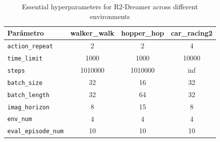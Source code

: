 \documentclass{article}
\begin{document}
\begin{table}[H]
    \centering
    \caption{Essential hyperparameters for R2-Dreamer across different environments}
    \label{tab:hyperparams}
    \begin{tabular}{lccc}
        \hline
        \textbf{Parámetro}          & \textbf{walker\_walk} & \textbf{hopper\_hop} & \textbf{car\_racing2} \\
        \hline
        \texttt{action\_repeat}     & 2                     & 2                    & 4                     \\
        \texttt{time\_limit}        & 1000                  & 1000                 & 10000                 \\
        \texttt{steps}              & 1010000               & 1010000              & inf                   \\
        \texttt{batch\_size}        & 32                    & 16                   & 32                    \\
        \texttt{batch\_length}      & 32                    & 64                   & 32                    \\
        \texttt{imag\_horizon}      & 8                     & 15                   & 8                     \\
        \texttt{env\_num}           & 4                     & 4                    & 4                     \\
        \texttt{eval\_episode\_num} & 10                    & 10                   & 10                    \\
        \hline
    \end{tabular}
\end{table}
\end{document}

